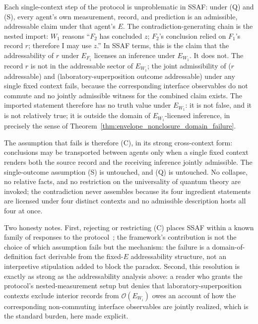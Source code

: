 \documentclass[aps,prx,onecolumn,11pt]{revtex4-2}
\theoremstyle{plain}
\theoremstyle{definition}
\theoremstyle{remark}
\begin{document}
Each single-context step of the protocol is unproblematic in SSAF:
under (Q) and (S), every agent's own measurement, record, and
prediction is an admissible, addressable claim under that agent's
\(E\). The contradiction-generating chain is the nested import: \(W_1\)
reasons ``\(F_2\) has concluded \(z\); \(F_2\)'s conclusion relied on
\(F_1\)'s record \(r\); therefore I may use \(z\).'' In SSAF terms,
this is the claim that the addressability of \(r\) under \(E_{F_1}\)
licenses an inference under \(E_{W_1}\). It does not. The record \(r\)
is not in the addressable sector of \(E_{W_1}\); the joint
admissibility of (\(r\) addressable) and (laboratory-superposition
outcome addressable) under any single fixed context fails, because the
corresponding interface observables do not commute and no jointly
admissible witness for the combined claim exists. The imported
statement therefore has no truth value under \(E_{W_1}\): it is not
false, and it is not relatively true; it is outside the domain of
\(E_{W_1}\)-licensed inference, in precisely the sense of
Theorem~\ref{thm:envelope_nonclosure_domain_failure}.

The assumption that fails is therefore (C), in its strong cross-context
form: conclusions may be transported between agents only when a single
fixed context renders both the source record and the receiving
inference jointly admissible. The single-outcome assumption (S) is
untouched, and (Q) is untouched. No collapse, no relative facts, and no
restriction on the universality of quantum theory are invoked; the
contradiction never assembles because its four ingredient statements
are licensed under four distinct contexts and no admissible description
hosts all four at once.

Two honesty notes. First, rejecting or restricting (C) places SSAF
within a known family of responses to the
protocol~\cite{FrauchigerRenner2018}; the framework's contribution is
not the choice of which assumption fails but the mechanism: the failure
is a domain-of-definition fact derivable from the fixed-\(E\)
addressability structure, not an interpretive stipulation added to
block the paradox. Second, this resolution is exactly as strong as the
addressability analysis above: a reader who grants the protocol's
nested-measurement setup but denies that laboratory-superposition
contexts exclude interior records from \(\mathcal O(E_{W_i})\) owes an
account of how the corresponding non-commuting interface observables
are jointly realized, which is the standard burden, here made explicit.
\end{document}

